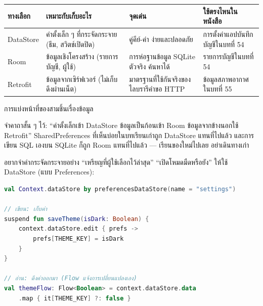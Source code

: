 


\begin{center}
\begin{tabularx}{\linewidth}{|X|X|X|X|}
\hline
\textbf{ทางเลือก} & \textbf{เหมาะกับเก็บอะไร} & \textbf{จุดเด่น} & \textbf{ใช้ตรงไหนในหนังสือ} \tabularnewline
\hline
DataStore & ค่าตั้งเล็ก ๆ ที่กระจัดกระจาย (ธีม, สวิตช์เปิดปิด) & คู่คีย์-ค่า ง่ายและปลอดภัย & การตั้งค่าแอปบันทึกบัญชีในบทที่ 54 \tabularnewline
Room & ข้อมูลเชิงโครงสร้าง (รายการบัญชี, ผู้ใช้) & การห่อฐานข้อมูล SQLite ตัวจริง ค้นหาได้ & รายการบัญชีในบทที่ 54 \tabularnewline
Retrofit & ข้อมูลจากเซิร์ฟเวอร์ (ไม่เก็บ ดึงผ่านเน็ต) & มาตรฐานที่ใช้กันจริงของไลบรารีคำขอ HTTP & ข้อมูลสภาพอากาศในบทที่ 55 \tabularnewline
\hline
\end{tabularx}
\end{center}

\begin{center}\small\color{gray}การแบ่งหน้าที่ของสามชิ้นเรื่องข้อมูล\end{center}

จำคาถาสั้น ๆ ไว้: “ค่าตั้งเล็กเข้า DataStore ข้อมูลเป็นก้อนเข้า Room ข้อมูลจากข้างนอกใช้ Retrofit” SharedPreferences ที่เห็นบ่อยในบทเรียนเก่าถูก DataStore แทนที่ไปแล้ว และการเขียน SQL เองบน SQLite ก็ถูก Room แทนที่ไปแล้ว — เรียนของใหม่ไปเลย อย่าเดินทางเก่า


อยากจำค่ากระจัดกระจายอย่าง “เหรียญที่ผู้ใช้เลือกไว้ล่าสุด” “เปิดโหมดมืดหรือยัง” ให้ใช้ DataStore (แบบ Preferences):

\begin{lstlisting}[language=Kotlin]
val Context.dataStore by preferencesDataStore(name = "settings")

// เขียน: เก็บค่า
suspend fun saveTheme(isDark: Boolean) {
    context.dataStore.edit { prefs ->
        prefs[THEME_KEY] = isDark
    }
}

// อ่าน: ดึงค่าออกมา (Flow แจ้งการเปลี่ยนแปลงเอง)
val themeFlow: Flow<Boolean> = context.dataStore.data
    .map { it[THEME_KEY] ?: false }
\end{lstlisting}

